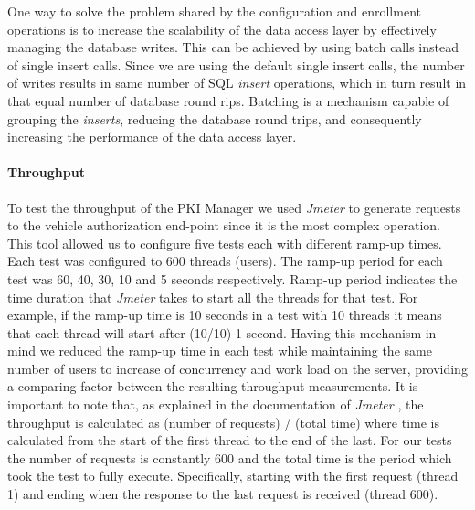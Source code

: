 	One way to solve the problem shared by the configuration and enrollment operations is to increase the scalability of the data access layer by effectively managing the database writes. This can be achieved by using batch calls instead of single insert calls. Since we are using the default single insert calls, the number of writes results in same number of SQL \textit{insert} operations, which in turn result in that equal number of database round rips. Batching is a mechanism capable of grouping the \textit{inserts}, reducing the database round trips, and consequently increasing the performance of the data access layer. 
	
	\paragraph{Throughput}
	
	To test the throughput of the PKI Manager we used \textit{Jmeter} to generate requests to the vehicle authorization end-point since it is the most complex operation. This tool allowed us to configure five tests each with different ramp-up times. Each test was configured to 600 threads (users). The ramp-up period for each test was 60, 40, 30, 10 and 5 seconds respectively. Ramp-up period indicates the time duration that \textit{Jmeter} takes to start all the threads for that test. For example, if the ramp-up time is 10 seconds in a test with 10 threads it means that each thread will start after (10/10) 1 second. Having this mechanism in mind we reduced the ramp-up time in each test while maintaining the same number of users to increase of concurrency and work load on the server, providing a comparing factor between the resulting throughput measurements. It is important to note that, as explained in the documentation of \textit{Jmeter} \cite{throughput}, the throughput is calculated as (number of requests) / (total time) where time is calculated from the start of the first thread to the end of the last. For our tests the number of requests is constantly 600 and the total time is the period which took the test to fully execute. Specifically, starting with the first request (thread 1) and ending when the response to the last request is received (thread 600).
	
